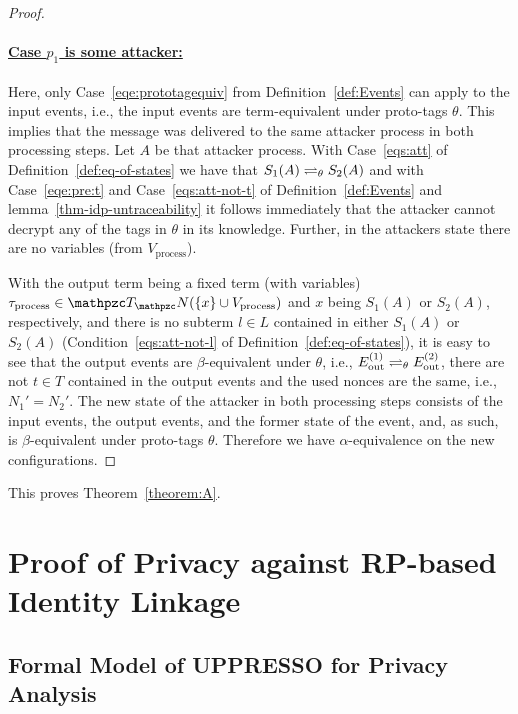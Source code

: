 \documentclass[letterpaper,onecolumn,10pt]{article}
\begin{document}
\begin{proof}
  \paragraph{\underline{Case $p_1$ is some attacker:}}
  
  Here, only Case~\ref{eqe:prototagequiv} from
  Definition~\ref{def:Events} can apply to the input events,
  i.e., the input events are term-equivalent under proto-tags
  $\theta$. This implies that the message was delivered to the 
  same attacker process in both processing steps. Let $A$ be 
  that attacker process. With Case~\ref{eqs:att} of 
  Definition~\ref{def:eq-of-states} we have that 
  $S_1(A) \rightleftharpoons_{\theta} S_2(A)$ and with 
  Case~\ref{eqe:pre:t} and Case~\ref{eqs:att-not-t} of 
  Definition~\ref{def:Events} and 
  lemma~\ref{thm-idp-untraceability} 
  it follows immediately that the 
  attacker cannot decrypt any of the tags in $\theta$ in its 
  knowledge. Further, in the attackers state there are no 
  variables (from $V_\text{process}$). 

  With the output term being a fixed term (with variables)
  $\tau_{\text{process}} \in \terms(\{x\} \cup V_\text{process})$ 
  and $x$ being $S_1(A)$ or $S_2(A)$, respectively, and there 
  is no subterm $l \in L$ contained in either $S_1(A)$ or 
  $S_2(A)$ (Condition~\ref{eqs:att-not-l} of 
  Definition~\ref{def:eq-of-states}), it is easy to see that 
  the output events are $\beta$-equivalent under $\theta$, i.e., 
  $E ^{(1)}_\text{out} \rightleftharpoons_{\theta} E^{(2)}_\text{out}$, there
  are not $t \in T$ contained in the output events and the 
  used nonces are the same, i.e., $N_1' = N_2'$. The new state 
  of the attacker in both processing steps consists of the 
  input events, the output events, and the former state of the 
  event, and, as such, is $\beta$-equivalent under proto-tags 
  $\theta$. Therefore we have $\alpha$-equivalence on the
  new configurations.
\end{proof}

This proves Theorem~\ref{theorem:A}.\QED

\section{Proof of Privacy against RP-based Identity Linkage}

\subsection{Formal Model of UPPRESSO for Privacy Analysis}
\end{document}
